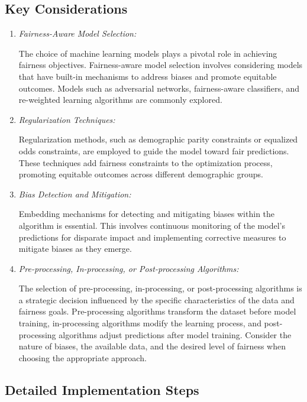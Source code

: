 \documentclass[12pt,a4paper,openright,twoside]{book}
\begin{document}
\subsection{Key Considerations}

\begin{enumerate}

    \item \emph{Fairness-Aware Model Selection:} 
    
    The choice of machine learning models plays a pivotal role in achieving fairness objectives. Fairness-aware model selection involves considering models that have built-in mechanisms to address biases and promote equitable outcomes. Models such as adversarial networks, fairness-aware classifiers, and re-weighted learning algorithms are commonly explored.

    \item \emph{Regularization Techniques:} 
    
    Regularization methods, such as demographic parity constraints or equalized odds constraints, are employed to guide the model toward fair predictions. These techniques add fairness constraints to the optimization process, promoting equitable outcomes across different demographic groups.

    \item \emph{Bias Detection and Mitigation:} 
    
    Embedding mechanisms for detecting and mitigating biases within the algorithm is essential. This involves continuous monitoring of the model's predictions for disparate impact and implementing corrective measures to mitigate biases as they emerge.

    \item \emph{Pre-processing, In-processing, or Post-processing Algorithms:} 
    
    The selection of pre-processing, in-processing, or post-processing algorithms is a strategic decision influenced by the specific characteristics of the data and fairness goals. Pre-processing algorithms transform the dataset before model training, in-processing algorithms modify the learning process, and post-processing algorithms adjust predictions after model training. Consider the nature of biases, the available data, and the desired level of fairness when choosing the appropriate approach.

\end{enumerate}

\subsection{Detailed Implementation Steps}
\end{document}
